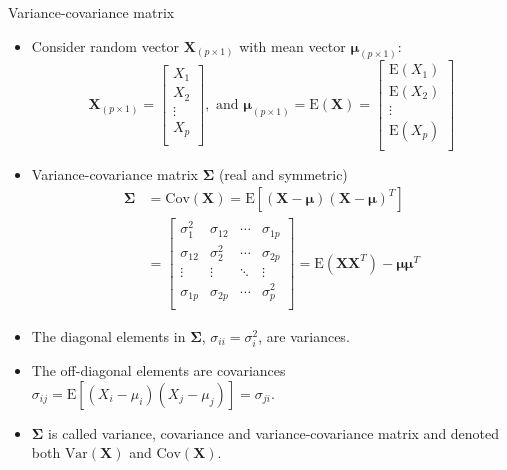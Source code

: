 \documentclass[ignorenonframetext,]{beamer}
\begin{document}
\begin{frame}

\begin{block}{Variance-covariance matrix}

\vspace{2mm}

\begin{itemize}
\item
  Consider random vector \(\boldsymbol{X}_{(p\times 1)}\) with mean
  vector \(\boldsymbol{\mu}_{(p\times 1)}\):
  \[\boldsymbol{X}_{(p\times 1)} =\left[ \begin{array}{c} X_1\\ X_2\\ \vdots\\ X_p\\ \end{array} \right], \text{ and }\boldsymbol{\mu}_{(p\times 1)} =\text{E}(\boldsymbol{X})=\left[ \begin{array}{c} \text{E}(X_1)\\ \text{E}(X_2)\\ \vdots\\ \text{E}(X_p)\\ \end{array}\right]\]
\item
  Variance-covariance matrix \(\boldsymbol\Sigma\) (real and symmetric)
  \begin{align*}
  \boldsymbol\Sigma & =\text{Cov}(\boldsymbol{X})  
  =\text{E}[(\boldsymbol{X}-\boldsymbol{\mu})(\boldsymbol{X}-\boldsymbol{\mu})^T] \\
  & = \left[ \begin{array}{cccc} \sigma_{1}^2 & \sigma_{12} & \cdots & \sigma_{1p}\\ \sigma_{12} & \sigma_{2}^2 & \cdots & \sigma_{2p}\\ \vdots & \vdots & \ddots & \vdots\\ \sigma_{1p} & \sigma_{2p} & \cdots & \sigma_{p}^2\\ \end{array}  \right] 
   = \text{E}(\boldsymbol{X}\boldsymbol{X}^T)-\boldsymbol{\mu}\boldsymbol{\mu}^T
  \end{align*}
\end{itemize}

\end{block}

\end{frame}

\begin{frame}

\begin{itemize}
\item
  The diagonal elements in \(\boldsymbol\Sigma\),
  \(\sigma_{ii}=\sigma_i^2\), are variances.
\item
  The off-diagonal elements are covariances
  \(\sigma_{ij}=\text{E}[(X_i-\mu_i)(X_j-\mu_j)]=\sigma_{ji}\).
\item
  \(\boldsymbol\Sigma\) is called variance, covariance and
  variance-covariance matrix and denoted both
  \(\text{Var}(\boldsymbol{X})\) and \(\text{Cov}(\boldsymbol{X})\).
\end{itemize}

\end{frame}
\end{document}
